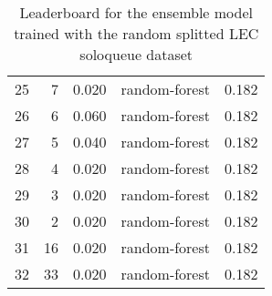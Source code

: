 \begin{table}[]
\begin{tabular}{lrrlr}
		25 & 7    & 0.020           & random-forest & 0.182 \\
		26 & 6    & 0.060           & random-forest & 0.182 \\
		27 & 5    & 0.040           & random-forest & 0.182 \\
		28 & 4    & 0.020           & random-forest & 0.182 \\
		29 & 3    & 0.020           & random-forest & 0.182 \\
		30 & 2    & 0.020           & random-forest & 0.182 \\
		31 & 16   & 0.020           & random-forest & 0.182 \\
		32 & 33   & 0.020           & random-forest & 0.182 \\
	\end{tabular}

	\caption{Leaderboard for the ensemble model trained with the random splitted LEC soloqueue dataset}
	\label{tab:lb-lec-games-full-randsplit}
\end{table}

